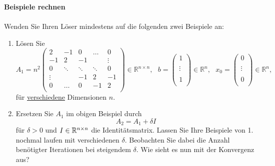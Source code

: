 	
		 \textbf{Beispiele rechnen}\\
	~\\
	Wenden Sie Ihren Löser \textbf{} mindestens auf die folgenden zwei Beispiele an:
	\begin{enumerate}
		\item Lösen Sie	$$
		A_1 = n^2 \left(\begin{array}{rrrrr}                                
		2 & -1  &0   & \hdots   & 0 \\                                               
		-1 &  2 & -1  &    &   \vdots \\                                               
		0&  \ddots &  \ddots &\ddots  &0  \\ 
		\vdots  &    &  -1 &  2 & -1  \\ 
		0 &   \hdots  & 0& -1  &  2 \\
		\end{array}\right)\in \mathbb{R}^{n \times n},~~~  
		b = \left(\begin{array}{rrrrr}                                
		1 \\                                               
		\\                                               
		\vdots  \\ 
		\\ 
		1  \\ 
		\end{array}\right) \in \mathbb{R}^{n}, ~~~x_0 =  \left(\begin{array}{rrrrr}                                
		0 \\                                               
		\\                                               
		\vdots  \\ 
		\\ 
		0  \\ 
		\end{array}\right) \in \mathbb{R}^{n},$$ 	für \underline{verschiedene} Dimensionen $n$.
		\item Ersetzen Sie $A_1$ im obigen Beispiel durch
		$$
		A_2 = A_1 + \delta I$$
		für $\delta > 0$ und $I \in {\mathbb{R}}^{n\times n}$ die Identitätsmatrix. Lassen Sie Ihre Beispiele von 1. nochmal laufen mit verschiedenen $\delta$.   Beobachten Sie dabei die Anzahl benötigter Iterationen bei steigendem $\delta$. Wie sieht es nun mit der Konvergenz aus?
	\end{enumerate}
